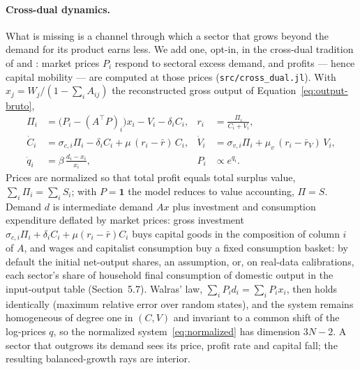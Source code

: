 \documentclass[11pt]{article}
\begin{document}
\paragraph{Cross-dual dynamics.} What is missing is a channel through
which a sector that grows beyond the demand for its product earns less.
We add one, opt-in, in the cross-dual tradition of
\citet{flaschel1987classical} and \citet{flaschel1997dynamic}: market
prices $P_i$ respond to sectoral excess demand, and profits --- hence
capital mobility --- are computed at those prices
(\texttt{src/cross\_dual.jl}). With $x_j=W_j/(1-\sum_iA_{ij})$ the
reconstructed gross output of Equation~\eqref{eq:output-bruto},
\begin{align}
  \Pi_i &= \big(P_i-(A^{\top}P)_i\big)x_i - V_i - \delta_iC_i, &
  r_i &= \frac{\Pi_i}{C_i+V_i}, \nonumber\\
  \dot C_i &= \sigma_{c,i}\Pi_i-\delta_iC_i+\mu\,(r_i-\bar r)\,C_i, &
  \dot V_i &= \sigma_{v,i}\Pi_i+\mu_v\,(r_i-\bar r_V)\,V_i, \label{eq:crossdual}\\
  \dot q_i &= \beta\,\frac{d_i-x_i}{x_i}, & P_i &\propto e^{q_i}. \nonumber
\end{align}
Prices are normalized so that total profit equals total surplus value,
$\sum_i\Pi_i=\sum_iS_i$; with $P=\mathbf 1$ the model reduces to value
accounting, $\Pi=S$. Demand $d$ is intermediate demand $Ax$ plus
investment and consumption expenditure deflated by market prices:
gross investment $\sigma_{c,i}\Pi_i+\delta_iC_i+\mu(r_i-\bar r)C_i$ buys
capital goods in the composition of column $i$ of $A$, and wages and
capitalist consumption buy a fixed consumption basket: by default the
initial net-output shares, an assumption, or, on real-data calibrations,
each sector's share of household final consumption of domestic output in
the input-output table (Section~5.7). Walras' law, $\sum_iP_id_i=\sum_iP_ix_i$,
then holds identically (maximum relative error \AccWalrasErr{} over
random states), and the system remains homogeneous of degree one in
$(C,V)$ and invariant to a common shift of the log-prices $q$, so the
normalized system~\eqref{eq:normalized} has dimension $3N-2$. A sector
that outgrows its demand sees its price, profit rate and capital fall;
the resulting balanced-growth rays are interior.
\end{document}
